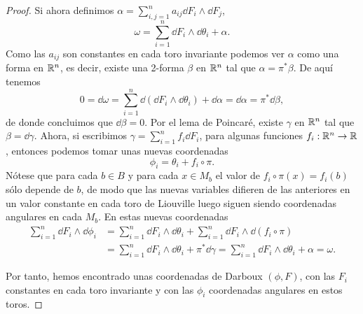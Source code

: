 \begin{proof}
Si ahora definimos $\alpha=\sum_{i,j=1}^n a_{ij}\dd F_i \wedge \dd F_j$,
\[
  \omega=\sum_{i=1}^n \dd F_i \wedge \dd \theta_i + \alpha.
\]
Como las $a_{ij}$ son constantes en cada toro invariante podemos ver $\alpha$ como  una forma en $\mathbb{R}^n$, es decir, existe una 2-forma $\beta$ en $\mathbb{R}^n$ tal que
  $\alpha=\pi^* \beta$.
De aquí tenemos
\[
  0=\dd \omega= \sum_{i=1}^n \dd(\dd F_i \wedge \dd \theta_i) + \dd \alpha= \dd \alpha = \pi^* \dd \beta,
\]
de donde concluimos que $\dd \beta =0$. Por el lema de Poincaré, existe $\gamma$ en $\mathbb{R}^n$ tal que $\beta= \dd \gamma$.
Ahora, si escribimos $\gamma= \sum_{i=1}^n f_i \dd F_i$, para algunas funciones $f_i:\mathbb{R}^n \rightarrow \mathbb{R}$, entonces podemos tomar unas nuevas coordenadas 
\[
  \phi_i= \theta_i + f_i \circ \pi.
\]
Nótese que para cada $b\in B$ y para cada $x\in M_b$ el valor de $f_i\circ \pi (x)=f_i(b)$ sólo depende de $b$, de modo que las nuevas variables difieren de las anteriores en un valor constante en cada toro de Liouville luego siguen siendo coordenadas angulares en cada $M_b$.
En estas nuevas coordenadas
\[
\begin{split}
  \sum_{i=1}^n \dd F_i \wedge \dd \phi_i & = \sum_{i=1}^n \dd F_i \wedge \dd \theta_i + \sum_{i=1}^n \dd F_i \wedge \dd(f_i \circ \pi)  \\
   & =\sum_{i=1}^n \dd F_i \wedge \dd \theta_i + \pi^* \dd \gamma = \sum_{i=1}^n \dd F_i \wedge \dd \theta_i + \alpha = \omega.
\end{split}
\]

Por tanto, hemos encontrado unas coordenadas de Darboux $(\phi,F)$, con las $F_i$ constantes en cada toro invariante y con las $\phi_i$ coordenadas angulares en estos toros. 
\end{proof}

